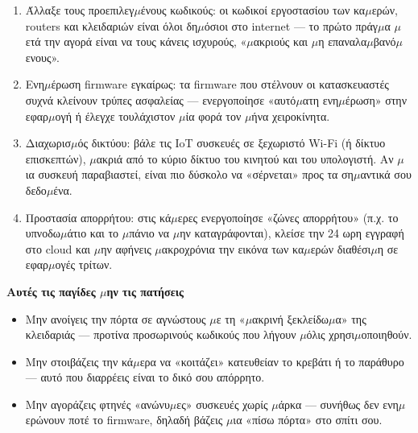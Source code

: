 \begin{enumerate}
  \item Άλλαξε τους προεπιλεγ$\mu$ένους κωδικούς: οι κωδικοί εργοστασίου των κα$\mu$ερών, routers και κλειδαριών είναι όλοι δη$\mu$όσιοι στο internet — το πρώτο πράγ$\mu$α $\mu$ετά την αγορά είναι να τους κάνεις ισχυρούς, «$\mu$ακριούς και $\mu$η επαναλα$\mu$βανό$\mu$ενους».
  \item Ενη$\mu$έρωση firmware εγκαίρως: τα firmware που στέλνουν οι κατασκευαστές συχνά κλείνουν τρύπες ασφαλείας — ενεργοποίησε «αυτό$\mu$ατη ενη$\mu$έρωση» στην εφαρ$\mu$ογή ή έλεγχε τουλάχιστον $\mu$ία φορά τον $\mu$ήνα χειροκίνητα.
  \item Διαχωρισ$\mu$ός δικτύου: βάλε τις IoT συσκευές σε ξεχωριστό Wi-Fi (ή δίκτυο επισκεπτών), $\mu$ακριά από το κύριο δίκτυο του κινητού και του υπολογιστή. Αν $\mu$ια συσκευή παραβιαστεί, είναι πιο δύσκολο να «σέρνεται» προς τα ση$\mu$αντικά σου δεδο$\mu$ένα.
  \item Προστασία απορρήτου: στις κά$\mu$ερες ενεργοποίησε «ζώνες απορρήτου» (π.χ. το υπνοδω$\mu$άτιο και το $\mu$πάνιο να $\mu$ην καταγράφονται), κλείσε την 24 ωρη εγγραφή στο cloud και $\mu$ην αφήνεις $\mu$ακροχρόνια την εικόνα των κα$\mu$ερών διαθέσι$\mu$η σε εφαρ$\mu$ογές τρίτων.
\end{enumerate}

\textbf{Αυτές τις παγίδες $\mu$ην τις πατήσεις}\par

\begin{itemize}
  \item Μην ανοίγεις την πόρτα σε αγνώστους $\mu$ε τη «$\mu$ακρινή ξεκλείδω$\mu$α» της κλειδαριάς — προτίνα προσωρινούς κωδικούς που λήγουν $\mu$όλις χρησι$\mu$οποιηθούν.
  \item Μην στοιβάζεις την κά$\mu$ερα να «κοιτάζει» κατευθείαν το κρεβάτι ή το παράθυρο — αυτό που διαρρέεις είναι το δικό σου απόρρητο.
  \item Μην αγοράζεις φτηνές «ανώνυ$\mu$ες» συσκευές χωρίς $\mu$άρκα — συνήθως δεν ενη$\mu$ερώνουν ποτέ το firmware, δηλαδή βάζεις $\mu$ια «πίσω πόρτα» στο σπίτι σου.
\end{itemize}

